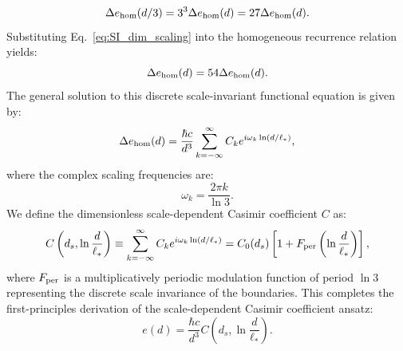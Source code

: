 \documentclass[12pt,letterpaper]{article}
\begin{document}
\begin{equation}
\Delta e_{\rm hom}(d/3) = 3^3 \Delta e_{\rm hom}(d) = 27 \Delta e_{\rm hom}(d).
\label{eq:SI_dim_scaling}
\end{equation}
Substituting Eq.~\eqref{eq:SI_dim_scaling} into the homogeneous recurrence relation yields:
\begin{equation}
\Delta e_{\rm hom}(d) = 54 \Delta e_{\rm hom}(d).
\label{eq:SI_hom_recurrence}
\end{equation}
The general solution to this discrete scale-invariant functional equation is given by:
\begin{equation}
\Delta e_{\rm hom}(d) = \frac{\hbar c}{d^3} \sum_{k=-\infty}^{\infty} C_k e^{i \omega_k \ln(d/\ell_*)},
\label{eq:SI_hom_sol}
\end{equation}
where the complex scaling frequencies are:
\begin{equation}
\omega_k = \frac{2\pi k}{\ln 3}.
\label{eq:SI_freqs}
\end{equation}
We define the dimensionless scale-dependent Casimir coefficient $C$ as:
\begin{equation}
C\left(d_s, \ln\frac{d}{\ell_*}\right) \equiv \sum_{k=-\infty}^{\infty} C_k e^{i \omega_k \ln(d/\ell_*)} = C_0(d_s) \left[ 1 + F_{\rm per}\left(\ln\frac{d}{\ell_*}\right) \right],
\label{eq:SI_C_def}
\end{equation}
where $F_{\rm per}$ is a multiplicatively periodic modulation function of period $\ln 3$ representing the discrete scale invariance of the boundaries. This completes the first-principles derivation of the scale-dependent Casimir coefficient ansatz:
\begin{equation}
e(d) = \frac{\hbar c}{d^3} C\left(d_s, \ln\frac{d}{\ell_*}\right).
\label{eq:SI_energy_ansatz}
\end{equation}
\end{document}
